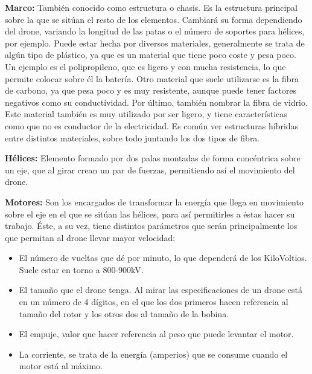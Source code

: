 \hspace{1 cm}\textbf{Marco:} Tambi\'en conocido como estructura o chasis. Es la estructura principal sobre la que se sit\'uan el resto de los elementos. Cambiar\'a su forma dependiendo del drone, variando la longitud de las patas o el n\'umero de soportes para h\'elices, por ejemplo. Puede estar hecha por diversos materiales, generalmente se trata de alg\'un tipo de pl\'astico, ya que es un material que tiene poco coste y pesa poco. Un ejemplo es el polipropileno, que es ligero y con mucha resistencia, lo que permite colocar sobre \'el la bater\'ia. Otro material que suele utilizarse es la fibra de carbono, ya que pesa poco y es muy resistente, aunque puede tener factores negativos como su conductividad. Por \'ultimo, tambi\'en nombrar la fibra de vidrio. Este material tambi\'en es muy utilizado por ser ligero, y tiene caracter\'isticas como que no es conductor de la electricidad. Es com\'un ver estructuras h\'ibridas entre distintos materiales, sobre todo juntando los dos tipos de fibra. 

\hspace{1 cm}\textbf{H\'elices:} Elemento formado por dos palas montadas de forma conc\'entrica sobre un eje, que al girar crean un par de fuerzas, permitiendo as\'i el movimiento del drone.

\hspace{1 cm}\textbf{Motores:} Son los encargados de transformar la energ\'ia que llega en movimiento sobre el eje en el que se sit\'uan las h\'elices, para as\'i permitirles a \'estas hacer su trabajo. \'Este, a su vez, tiene distintos par\'ametros que ser\'an principalmente los que permitan al drone llevar mayor velocidad: 

\begin{itemize}
\item El n\'umero de vueltas que d\'e por minuto, lo que depender\'a de los KiloVoltios. Suele estar en torno a 800-900kV.

\item El tamaño que el drone tenga. Al mirar las especificaciones de un drone est\'a en un n\'umero de 4 d\'igitos, en el que los dos primeros hacen referencia al tamaño del rotor y los otros dos al tamaño de la bobina. 

\item El empuje, valor que hacer referencia al peso que puede levantar el motor.

\item La corriente, se trata de la energ\'ia (amperios) que se consume cuando el motor est\'a al m\'aximo.
\end{itemize}

